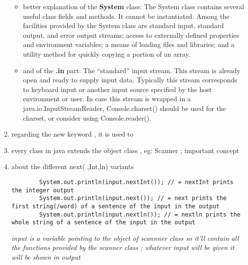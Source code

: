 \documentclass[11pt]{article}
\begin{document}
\begin{enumerate}
\begin{itemize}
\item better explanation of the \textbf{System} class: The System class contains several useful class fields and methods. It cannot be instantiated. Among the facilities provided by the System class are standard input, standard output, and error output streams; access to externally defined properties and environment variables; a means of loading files and libraries; and a utility method for quickly copying a portion of an array.
\item and of the \textbf{.in} part: The ``standard'' input stream. This stream is already open and ready to supply input data. Typically this stream corresponds to keyboard input or another input source specified by the host environment or user. In case this stream is wrapped in a java.io.InputStreamReader, Console.charset() should be used for the charset, or consider using Console.reader().
\end{itemize}

\item regarding the new keyword , it is used to

\item every class in java extends the object class , eg: Scanner ; important concept
\item about the different next( ,Int,ln) variants
\begin{verbatim}
        System.out.println(input.nextInt()); // = nextInt prints the integer output
        System.out.println(input.next()); // = next prints the first string(/word) of a sentence of the input in the output
        System.out.println(input.nextln()); // = nextln prints the whole string of a sentence of the input in the output
\end{verbatim}

\emph{input is a variable pointing to the object of scannner class so it'll contain all the functions provided by the scanner class ; whatever input will be given it will be shown in output}
\end{enumerate}
\end{document}
